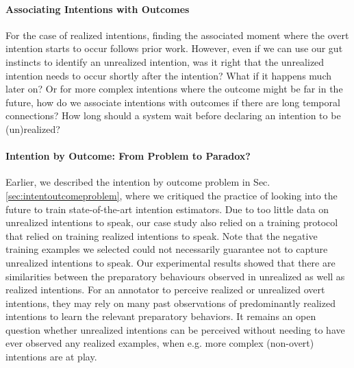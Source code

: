 \documentclass[sigconf]{acmart}
\begin{document}
\paragraph {Associating Intentions with Outcomes}
For the case of realized intentions, finding the associated moment where the overt intention starts to occur follows prior work. However, even if we can use our gut instincts to identify an unrealized intention, was it right that the unrealized intention needs to occur shortly after the intention? What if it happens much later on? Or for more complex intentions where the outcome might be far in the future, how do we associate intentions with outcomes if there are long temporal connections? How long should a system wait before declaring an intention to be (un)realized? 

\paragraph{Intention by Outcome: From Problem to Paradox?}
Earlier, we described the intention by outcome problem in Sec. \ref{sec:intentoutcomeproblem}, where we critiqued the practice of looking into the future to train state-of-the-art intention estimators. 
Due to too little data on unrealized intentions to speak, our case study also relied on a training protocol that relied on training realized intentions to speak. Note that the negative training examples we selected could not necessarily guarantee not to capture unrealized intentions to speak. Our experimental results showed that there are similarities between the preparatory behaviours observed in unrealized as well as realized intentions. For an annotator to perceive realized or unrealized overt intentions, they may rely on many past observations of predominantly realized intentions to learn the relevant preparatory behaviors. It remains an open question whether unrealized intentions can be perceived without needing to have ever observed any realized examples, when e.g. more complex (non-overt) intentions are at play. 
\end{document}
